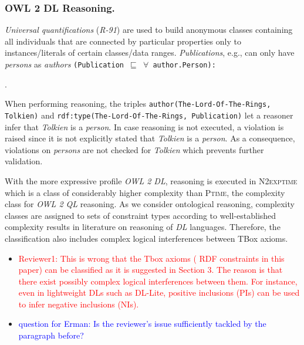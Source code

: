 \documentclass{acm_proc_article-sp}
\newcommand{\ms}[1]{%
  \texttt{#1}
}
\begin{document}
\subsubsection{OWL 2 DL Reasoning.}
{\em Universal quantifications} (\emph{R-91})
are used to build anonymous classes containing all individuals that are connected by particular properties only to instances/literals of certain classes/data ranges.
\emph{Publications}, e.g., can only have \emph{persons} as \emph{authors} {\small\ms{(Publication $\sqsubseteq$ $\forall$ author.Person):}}
\begin{ex}
 .
\end{ex}
When performing reasoning, the triples {\small\ms{author(The-Lord-Of-The-Rings,} \ms{Tolkien)}} and {\small\ms{rdf:type(The-Lord-Of-The-Rings, Publication)}} 
let a reasoner infer that \emph{Tolkien} is a \emph{person}.
In case reasoning is not executed, a violation is raised
since it is not explicitly stated that \emph{Tolkien} is a \emph{person}.
As a consequence, violations on \emph{persons} are not checked for \emph{Tolkien} which prevents further validation. 

With the more expressive profile \emph{OWL 2 DL}, reasoning is executed in \textsc{N2exptime} \cite{owl2profiles2008} 
which is a class of considerably higher complexity than \textsc{Ptime}, the complexity class for \emph{OWL 2 QL} reasoning.
As we consider ontological reasoning, complexity classes are assigned to sets of constraint types 
according to well-established complexity results in literature on reasoning of \emph{DL} languages.
Therefore, the classification also includes complex logical interferences between TBox axioms.

\begin{itemize}
  \item \textcolor{red}{Reviewer1: This is wrong that the Tbox axioms ( RDF constraints in this paper) can be classified as it is suggested in Section 3. The reason is that there exist possibly complex logical interferences between them. For instance, even in lightweight DLs such as  DL-Lite, positive inclusions (PIs) can be used to infer negative inclusions (NIs).}
	\item \textcolor{blue}{question for Erman: Is the reviewer's issue sufficiently tackled by the paragraph before?}
\end{itemize}
\end{document}
